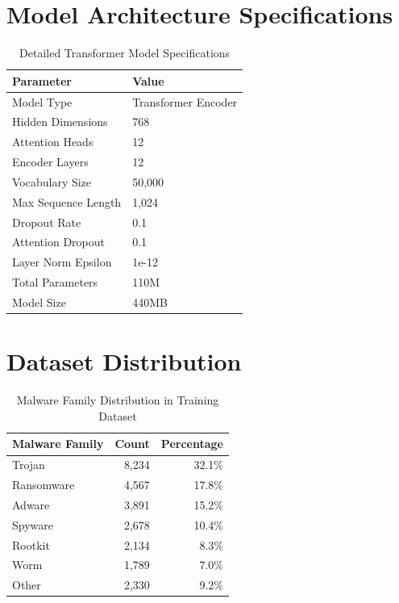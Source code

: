 \documentclass[12pt,a4paper]{article}
\begin{document}
\newpage
\appendix

\section{Model Architecture Specifications}

\begin{table}[H]
    \centering
    \caption{Detailed Transformer Model Specifications}
    \begin{tabular}{@{}ll@{}}
        \toprule
        Parameter           & Value               \\
        \midrule
        Model Type          & Transformer Encoder \\
        Hidden Dimensions   & 768                 \\
        Attention Heads     & 12                  \\
        Encoder Layers      & 12                  \\
        Vocabulary Size     & 50,000              \\
        Max Sequence Length & 1,024               \\
        Dropout Rate        & 0.1                 \\
        Attention Dropout   & 0.1                 \\
        Layer Norm Epsilon  & 1e-12               \\
        Total Parameters    & 110M                \\
        Model Size          & 440MB               \\
        \bottomrule
    \end{tabular}
    \label{tab:model_specs}
\end{table}

\section{Dataset Distribution}

\begin{table}[H]
    \centering
    \caption{Malware Family Distribution in Training Dataset}
    \begin{tabular}{@{}lrr@{}}
        \toprule
        Malware Family & Count & Percentage \\
        \midrule
        Trojan         & 8,234 & 32.1\%     \\
        Ransomware     & 4,567 & 17.8\%     \\
        Adware         & 3,891 & 15.2\%     \\
        Spyware        & 2,678 & 10.4\%     \\
        Rootkit        & 2,134 & 8.3\%      \\
        Worm           & 1,789 & 7.0\%      \\
        Other          & 2,330 & 9.2\%      \\
        \bottomrule
    \end{tabular}
    \label{tab:family_dist}
\end{table}
\end{document}
